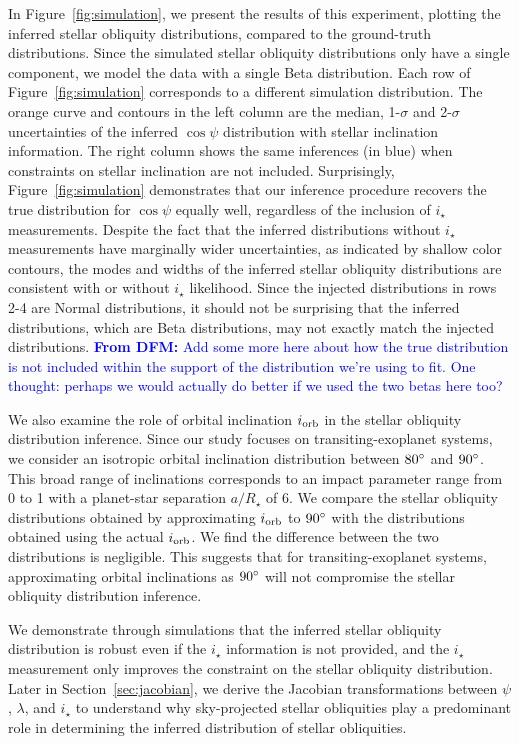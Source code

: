 \documentclass[twocolumn,times]{aastex631}
\newcommand{\dfm}[1]{\textcolor{blue}{\textbf{From DFM:} #1}}
\begin{document}
In Figure~\ref{fig:simulation}, we present the results of this experiment, plotting the inferred stellar obliquity distributions, compared to the ground-truth distributions.
Since the simulated stellar obliquity distributions only have a single component, we model the data with a single Beta distribution.
Each row of Figure~\ref{fig:simulation} corresponds to a different simulation distribution. The orange curve and contours in the left column are the median, 1-$\sigma$ and 2-$\sigma$ uncertainties of the inferred $\cos{\psi}$ distribution with stellar inclination information.
The right column shows the same inferences (in blue) when constraints on stellar inclination are not included.
Surprisingly, Figure~\ref{fig:simulation} demonstrates that our inference procedure recovers the true distribution for $\cos{\psi}$ equally well, regardless of the inclusion of $i_\star$ measurements.
Despite the fact that the inferred distributions without $i_\star$ measurements have marginally wider uncertainties, as indicated by shallow color contours, the modes and widths of the inferred stellar obliquity distributions are consistent with or without $i_\star$ likelihood.
Since the injected distributions in rows 2-4 are Normal distributions, it should not be surprising that the inferred distributions, which are Beta distributions, may not exactly match the injected distributions.
\dfm{Add some more here about how the true distribution is not included within the support of the distribution we're using to fit. One thought: perhaps we would actually do better if we used the two betas here too?}

We also examine the role of orbital inclination $i_{\rm orb}$ in the stellar obliquity distribution inference. Since our study focuses on transiting-exoplanet systems, we consider an isotropic orbital inclination distribution between $80\mbox{$^\circ$}$ and $90\mbox{$^\circ$}$. This broad range of inclinations corresponds to an impact parameter range from 0 to 1 with a planet-star separation $a/R_\star$ of 6.
We compare the stellar obliquity distributions obtained by approximating $i_{\rm orb}$ to $90\mbox{$^\circ$}$ with the distributions obtained using the actual $i_{\rm orb}$. We find the difference between the two distributions is negligible. This suggests that for transiting-exoplanet systems, approximating orbital inclinations as $90\mbox{$^\circ$}$ will not compromise the stellar obliquity distribution inference.

We demonstrate through simulations that the inferred stellar obliquity distribution is robust even if the $i_\star$ information is not provided, and the $i_\star$ measurement only improves the constraint on the stellar obliquity distribution. Later in Section~\ref{sec:jacobian}, we derive the Jacobian transformations between $\psi$, $\lambda$, and $i_\star$ to understand why sky-projected stellar obliquities play a predominant role in determining the inferred distribution of stellar obliquities.
\end{document}
